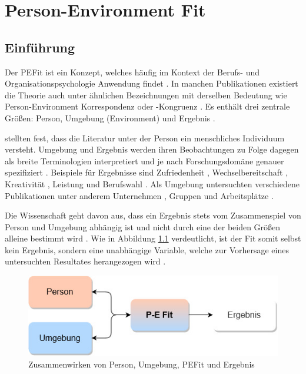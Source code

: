 \chapter{Person-Environment Fit}
\label{ch:personEnvironmentFit}

\section{Einführung}
\label{ch:personEnvironmentFit:einfuehrung}
Der \acf{PEFit} ist ein Konzept, welches häufig im Kontext der Berufs- und Organisationspsychologie Anwendung findet \cite[S. 2]{guan:2021}. In manchen Publikationen existiert die Theorie auch unter ähnlichen Bezeichnungen mit derselben Bedeutung wie Person-Environment Korrespondenz \cite[S. 1]{eggerth:2008} oder -Kongruenz \cite[S. 1]{muchinsky:1987}\cite[S. 53]{edwards:2008}. Es enthält drei zentrale Größen: Person, Umgebung (Environment) und Ergebnis \cite[S. 2]{livingstone:1997}.

\textcite[S. 5]{edwards:2007} stellten fest, dass die Literatur unter der Person ein menschliches Individuum versteht. Umgebung und Ergebnis werden ihren Beobachtungen zu Folge dagegen als breite Terminologien interpretiert und je nach Forschungsdomäne genauer spezifiziert \cite[S. 1ff.]{edwards:2007}. Beispiele für Ergebnisse sind Zufriedenheit \cite[S. 1]{lashani:2021}, Wechselbereitschaft \cite[S. 1]{amarneh:2021}, Kreativität \cite[S. 1]{duan:2019}, Leistung \cite[S. 6ff.]{elfenbein:2007} und  Berufswahl \cite[S. 1]{cable:1996}\cite[S. 1]{edwards:2007}. Als Umgebung untersuchten verschiedene Publikationen unter anderem Unternehmen \cite[S. 1]{kristof:1996}, Gruppen \cite[S. 1]{werbel:2001} und Arbeitsplätze \cite[S. 1]{lu:2014}\cite[S. 5]{edwards:2007}.

Die Wissenschaft geht davon aus, dass ein Ergebnis stets vom Zusammenspiel von Person und Umgebung abhängig ist und nicht durch eine der beiden Größen alleine bestimmt wird \cite[S. 1f.]{muchinsky:1987}. Wie in Abbildung \ref{fig:personEnvironmentFit:einfuehrung:abb1} verdeutlicht, ist der Fit somit selbst kein Ergebnis, sondern eine unabhängige Variable, welche zur Vorhersage eines untersuchten Resultates herangezogen wird \cite[S. 11]{caplan:1993}\cite[S.5]{edwards:1991}\cite[S. 1]{edwards:2002}.

\begin{figure}[h]
	\centering
	\includegraphics[width=1\textwidth]{gfx/P-E Fit.jpg}
	\caption{Zusammenwirken von Person, Umgebung, \acs{PEFit} und Ergebnis}
	\label{fig:personEnvironmentFit:einfuehrung:abb1}
\end{figure}

